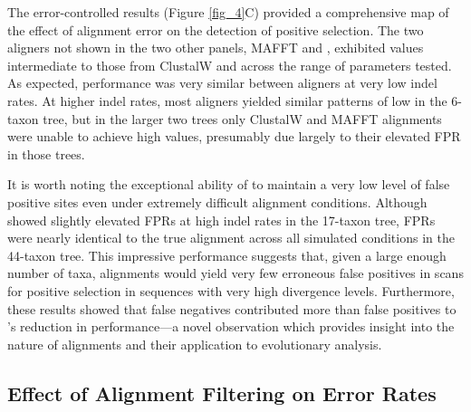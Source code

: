 \documentclass{mbe}
\begin{document}
The error-controlled \tpr results (Figure \ref{fig_4}C) provided a
comprehensive map of the effect of alignment error on the detection of
\sw positive selection. The two aligners not shown in the two other
panels, MAFFT and \pranka, exhibited \tpr values intermediate to those
from ClustalW and \prankc across the range of parameters tested. As
expected, performance was very similar between aligners at very low
indel rates. At higher indel rates, most aligners yielded similar
patterns of low \tpr in the 6-taxon tree, but in the larger two trees
only ClustalW and MAFFT alignments were unable to achieve high \tpr
values, presumably due largely to their elevated FPR in those trees.

It is worth noting the exceptional ability of \prankc to maintain a
very low level of false positive sites even under extremely difficult
alignment conditions. Although \prankc showed slightly elevated FPRs
at high indel rates in the 17-taxon tree, FPRs were nearly identical
to the true alignment across all simulated conditions in the 44-taxon
tree. This impressive performance suggests that, given a large enough
number of taxa, \prankc alignments would yield very few erroneous
false positives in scans for positive selection in sequences with very
high divergence levels. Furthermore, these results showed that false
negatives contributed more than false positives to \prankc{}'s
reduction in \sw performance---a novel observation which provides
insight into the nature of \prankc alignments and their application to
\sw evolutionary analysis.

\subsection*{Effect of Alignment Filtering on \Sw Error Rates}
\end{document}
